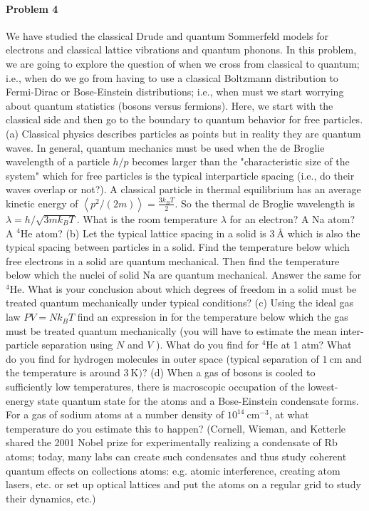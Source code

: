 \documentclass[hyperref, a4paper]{article}
\begin{document}
\paragraph{Problem 4} We have studied the classical Drude and quantum Sommerfeld models for electrons and classical lattice vibrations and quantum phonons. In this problem, we are going to explore the question of when we cross from classical to quantum; i.e., when do we go from having to use a classical Boltzmann distribution to Fermi-Dirac or Bose-Einstein distributions; i.e., when must we start worrying about quantum statistics (bosons versus fermions). Here, we start with the classical side and then go to the boundary to quantum behavior for free particles.
(a) Classical physics describes particles as points but in reality they are quantum waves. In general, quantum mechanics must be used when the de Broglie wavelength of a particle $h / p$ becomes larger than the "characteristic size of the system" which for free particles is the typical interparticle spacing (i.e., do their waves overlap or not?). A classical particle in thermal equilibrium has an average kinetic energy of $\left\langle p^2 /(2 m)\right\rangle=\frac{3 k_B T}{2}$. So the thermal de Broglie wavelength is $\lambda=h / \sqrt{3 m k_B T}$. What is the room temperature $\lambda$ for an electron? A Na atom? A $^4 \mathrm{He}$ atom?
(b) Let the typical lattice spacing in a solid is $\SI{3}{\angstrom}$ which is also the typical spacing between particles in a solid. Find the temperature below which free electrons in a solid are quantum mechanical. Then find the temperature below which the nuclei of solid $\mathrm{Na}$ are quantum mechanical. Answer the same for ${ }^4 \mathrm{He}$. What is your conclusion about which degrees of freedom in a solid must be treated quantum mechanically under typical conditions?
(c) Using the ideal gas law $P V=N k_B T$ find an expression in for the temperature below which the gas must be treated quantum mechanically (you will have to estimate the mean inter-particle separation using $N$ and $V$ ). What do you find for ${ }^4 \mathrm{He}$ at 1 atm? What do you find for hydrogen molecules in outer space (typical separation of $1 \mathrm{~cm}$ and the temperature is around $3 \mathrm{~K}) ?$
(d) When a gas of bosons is cooled to sufficiently low temperatures, there is macroscopic occupation of the lowest-energy state quantum state for the atoms and a Bose-Einstein condensate forms. For a gas of sodium atoms at a number density of $10^{14} \mathrm{~cm}^{-3}$, at what temperature do you estimate this to happen? (Cornell, Wieman, and Ketterle shared the 2001 Nobel prize for experimentally realizing a condensate of $\mathrm{Rb}$ atoms; today, many labs can create such condensates and thus study coherent quantum effects on collections atoms: e.g. atomic interference, creating atom lasers, etc. or set up optical lattices and put the atoms on a regular grid to study their dynamics, etc.)
\end{document}
